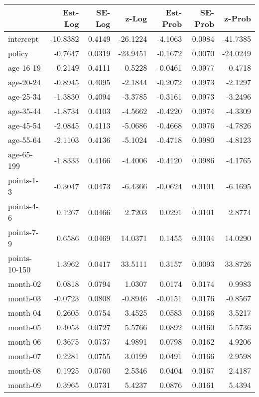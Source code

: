 \documentclass[10pt]{article}
\begin{document}
\begin{table}[ht]
\centering
\begin{tabular}{lrrrrrr}
  \hline
 & Est-Log & SE-Log & z-Log & Est-Prob & SE-Prob & z-Prob \\ 
  \hline
intercept & -10.8382 & 0.4149 & -26.1224 & -4.1063 & 0.0984 & -41.7385 \\ 
  policy & -0.7647 & 0.0319 & -23.9451 & -0.1672 & 0.0070 & -24.0249 \\ 
  age-16-19 & -0.2149 & 0.4111 & -0.5228 & -0.0461 & 0.0977 & -0.4718 \\ 
  age-20-24 & -0.8945 & 0.4095 & -2.1844 & -0.2072 & 0.0973 & -2.1297 \\ 
  age-25-34 & -1.3830 & 0.4094 & -3.3785 & -0.3161 & 0.0973 & -3.2496 \\ 
  age-35-44 & -1.8734 & 0.4103 & -4.5662 & -0.4220 & 0.0974 & -4.3309 \\ 
  age-45-54 & -2.0845 & 0.4113 & -5.0686 & -0.4668 & 0.0976 & -4.7826 \\ 
  age-55-64 & -2.1103 & 0.4136 & -5.1024 & -0.4718 & 0.0980 & -4.8123 \\ 
  age-65-199 & -1.8333 & 0.4166 & -4.4006 & -0.4120 & 0.0986 & -4.1765 \\ 
  points-1-3 & -0.3047 & 0.0473 & -6.4366 & -0.0624 & 0.0101 & -6.1695 \\ 
  points-4-6 & 0.1267 & 0.0466 & 2.7203 & 0.0291 & 0.0101 & 2.8774 \\ 
  points-7-9 & 0.6586 & 0.0469 & 14.0371 & 0.1455 & 0.0104 & 14.0290 \\ 
  points-10-150 & 1.3962 & 0.0417 & 33.5111 & 0.3157 & 0.0093 & 33.8726 \\ 
  month-02 & 0.0818 & 0.0794 & 1.0307 & 0.0174 & 0.0174 & 0.9983 \\ 
  month-03 & -0.0723 & 0.0808 & -0.8946 & -0.0151 & 0.0176 & -0.8567 \\ 
  month-04 & 0.2605 & 0.0754 & 3.4525 & 0.0583 & 0.0166 & 3.5217 \\ 
  month-05 & 0.4053 & 0.0727 & 5.5766 & 0.0892 & 0.0160 & 5.5736 \\ 
  month-06 & 0.3675 & 0.0737 & 4.9891 & 0.0798 & 0.0162 & 4.9206 \\ 
  month-07 & 0.2281 & 0.0755 & 3.0199 & 0.0491 & 0.0166 & 2.9598 \\ 
  month-08 & 0.1925 & 0.0760 & 2.5346 & 0.0404 & 0.0167 & 2.4187 \\ 
  month-09 & 0.3965 & 0.0731 & 5.4237 & 0.0876 & 0.0161 & 5.4394 \\ 

\end{tabular}
\end{table}
\end{document}
